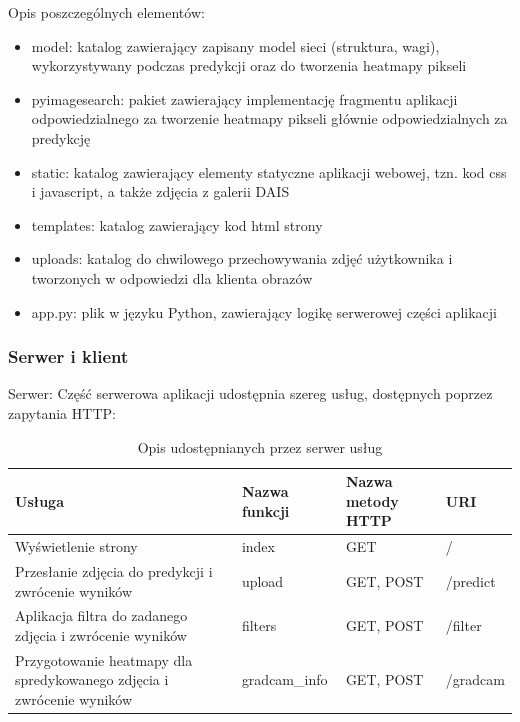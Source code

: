 \documentclass[polish,12pt]{aghthesis}
\begin{document}
\par\noindent Opis poszczególnych elementów:
\begin{itemize}
    \item model: katalog zawierający zapisany model sieci (struktura, wagi), wykorzystywany podczas predykcji oraz do tworzenia heatmapy pikseli
    \item pyimagesearch: pakiet zawierający implementację fragmentu aplikacji odpowiedzialnego za tworzenie heatmapy pikseli głównie odpowiedzialnych za predykcję
    \item static: katalog zawierający elementy statyczne aplikacji webowej, tzn. kod css i javascript, a także zdjęcia z galerii DAIS
    \item templates: katalog zawierający kod html strony
    \item uploads: katalog do chwilowego przechowywania zdjęć użytkownika i tworzonych w odpowiedzi dla klienta obrazów
    \item app.py: plik w języku Python, zawierający logikę serwerowej części aplikacji
\end{itemize}

\subsubsection{Serwer i klient}
\par Serwer:
\newline Część serwerowa aplikacji udostępnia szereg usług, dostępnych poprzez zapytania HTTP:
\renewcommand{\arraystretch}{1.75}
\begin{table}[h!]
\centering
 \begin{tabular}{|m{5cm}|m{3.5cm}|m{3.7cm}|m{2cm}|} 
 \hline
 Usługa & Nazwa funkcji & Nazwa metody HTTP & URI\\
 \hline
 Wyświetlenie strony & index & GET & /\\
 \hline
 Przesłanie zdjęcia do predykcji i zwrócenie wyników & upload & GET, POST & /predict\\
 \hline
 Aplikacja filtra do zadanego zdjęcia i zwrócenie wyników & filters & GET, POST & /filter\\
 \hline
 Przygotowanie heatmapy dla spredykowanego zdjęcia i zwrócenie wyników & gradcam\_info & GET, POST & /gradcam\\
 \hline
\end{tabular}
\caption{Opis udostępnianych przez serwer usług}
\label{table:7}
\end{table}
\end{document}
